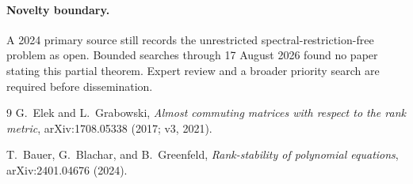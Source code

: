 \documentclass[10pt,a4paper]{article}
\begin{document}
\paragraph{Novelty boundary.}
A 2024 primary source still records the unrestricted spectral-restriction-free
problem as open.  Bounded searches through 17 August 2026 found no paper
stating this partial theorem.  Expert review and a broader priority search are
required before dissemination.

\begin{thebibliography}{9}\small
{}
G.~Elek and L.~Grabowski,
\emph{Almost commuting matrices with respect to the rank metric},
arXiv:1708.05338 (2017; v3, 2021).

T.~Bauer, G.~Blachar, and B.~Greenfeld,
\emph{Rank-stability of polynomial equations},
arXiv:2401.04676 (2024).
\end{thebibliography}
\end{document}
